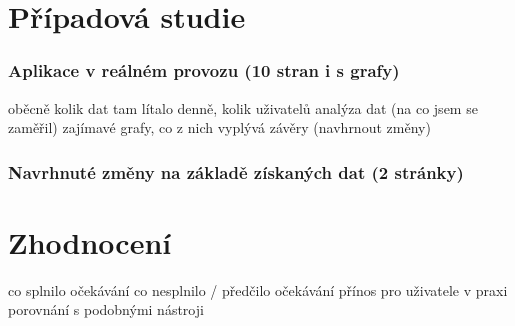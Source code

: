 \documentclass[bc,female,java,dept456]{diploma}						%
\begin{document}

\section{Případová studie}

\subsubsection{Aplikace v reálném provozu (10 stran i s grafy)}

oběcně kolik dat tam lítalo denně, kolik uživatelů
analýza dat (na co jsem se zaměřil)
zajímavé grafy, co z nich vyplývá
závěry (navhrnout změny)

\subsubsection{Navrhnuté změny na základě získaných dat (2 stránky)}


\section{Zhodnocení}
co splnilo očekávání
co nesplnilo / předčilo očekávání
přínos pro uživatele v praxi
porovnání s podobnými nástroji
\end{document}
